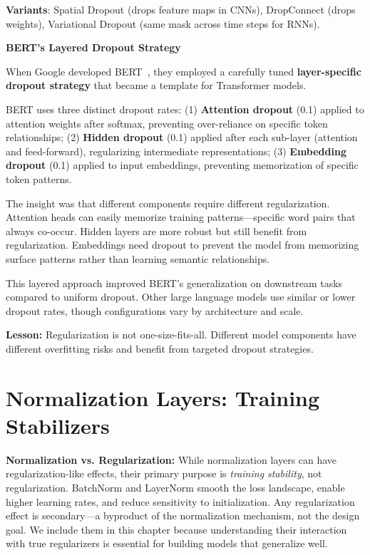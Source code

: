 \documentclass[../../main.tex]{subfiles}
\begin{document}
\textbf{Variants}: Spatial Dropout (drops feature maps in CNNs), DropConnect (drops weights), Variational Dropout (same mask across time steps for RNNs).

\begin{realworld}
\textbf{BERT's Layered Dropout Strategy}

When Google developed BERT~\cite{devlin2019bert}, they employed a carefully tuned \textbf{layer-specific dropout strategy} that became a template for Transformer models.

BERT uses three distinct dropout rates: (1) \textbf{Attention dropout} (0.1) applied to attention weights after softmax, preventing over-reliance on specific token relationships; (2) \textbf{Hidden dropout} (0.1) applied after each sub-layer (attention and feed-forward), regularizing intermediate representations; (3) \textbf{Embedding dropout} (0.1) applied to input embeddings, preventing memorization of specific token patterns.

The insight was that different components require different regularization. Attention heads can easily memorize training patterns---specific word pairs that always co-occur. Hidden layers are more robust but still benefit from regularization. Embeddings need dropout to prevent the model from memorizing surface patterns rather than learning semantic relationships.

This layered approach improved BERT's generalization on downstream tasks compared to uniform dropout. Other large language models use similar or lower dropout rates, though configurations vary by architecture and scale.

\textbf{Lesson:} Regularization is not one-size-fits-all. Different model components have different overfitting risks and benefit from targeted dropout strategies.
\end{realworld}

\section{Normalization Layers: Training Stabilizers}
\label{sec:normalization-layers}

\begin{important}
\textbf{Normalization vs. Regularization:} While normalization layers can have regularization-like effects, their primary purpose is \textit{training stability}, not regularization. BatchNorm and LayerNorm smooth the loss landscape, enable higher learning rates, and reduce sensitivity to initialization. Any regularization effect is secondary---a byproduct of the normalization mechanism, not the design goal. We include them in this chapter because understanding their interaction with true regularizers is essential for building models that generalize well.
\end{important}
\end{document}

